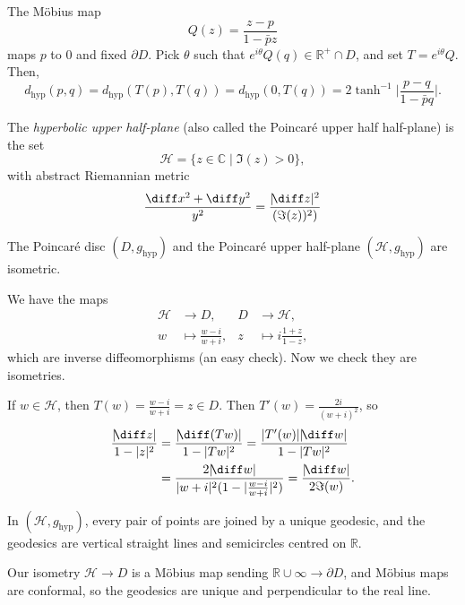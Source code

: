 \documentclass[12pt]{article}
\begin{document}
\begin{proofbox}
	The M\"{o}bius map
	\[
	Q(z) = \frac{z - p}{1 - \bar pz}
	\]
	maps $p$ to $0$ and fixed $\partial D$. Pick $\theta$ such that $e^{i\theta}Q(q) \in \mathbb{R}^{+}\cap D$, and set $T = e^{i\theta}Q$. Then,
	\[
		d_\mathrm{hyp}(p, q) = d_\mathrm{hyp}(T(p),T(q)) = d_\mathrm{hyp}(0, T(q)) = 2 \tanh^{-1} \biggl| \frac{p-q}{1 - \bar p q} \biggr|.
	\]
\end{proofbox}

\begin{definition}
	The \emph{hyperbolic upper half-plane} (also called the Poincar\'{e} upper half half-plane) is the set
	\[
		\mathcal{H} = \{z \in \mathbb{C} \mid \Im(z) > 0\},
	\]
	with abstract Riemannian metric
	\[
		\frac{\diff x^2 + \diff y^2}{y^2} = \frac{|\!\diff z|^2}{(\Im(z))^2)}
	\]
\end{definition}

\begin{lemma}
	The Poincar\'{e} disc $(D, g_\mathrm{hyp})$ and the Poincar\'{e} upper half-plane $(\mathcal{H}, g_\mathrm{hyp})$ are isometric.
\end{lemma}

\begin{proofbox}
	We have the maps
	\begin{align*}
		\mathcal{H} &\to D, & D &\to \mathcal{H}, \\
		w &\mapsto \frac{w-i}{w+i}, & z &\mapsto i \frac{1+z}{1-z},
	\end{align*}
	which are inverse diffeomorphisms (an easy check). Now we check they are isometries.

	If $w \in \mathcal{H}$, then $T(w) = \frac{w-i}{w+i} = z \in D$. Then $T'(w) = \frac{2i}{(w+i)^2}$, so
	\begin{align*}
		\frac{|\!\diff z|}{1 - |z|^2} &= \frac{|\!\diff (Tw)|}{1-|Tw|^2} = \frac{|T'(w)||\!\diff w|}{1-|Tw|^2} \\
					      &= \frac{2|\!\diff w|}{|w+i|^2(1 - |\frac{w-i}{w+i}|^2)} = \frac{|\!\diff w|}{2\Im(w)}.
	\end{align*}
\end{proofbox}

\begin{corollary}
	In $(\mathcal{H}, g_\mathrm{hyp})$, every pair of points are joined by a unique geodesic, and the geodesics are vertical straight lines and semicircles centred on $\mathbb{R}$.
\end{corollary}

\begin{proofbox}
	Our isometry $\mathcal{H} \to D$ is a M\"{o}bius map sending $\mathbb{R} \cup \infty \to \partial D$, and M\"{o}bius maps are conformal, so the geodesics are unique and perpendicular to the real line.
\end{proofbox}
\end{document}
